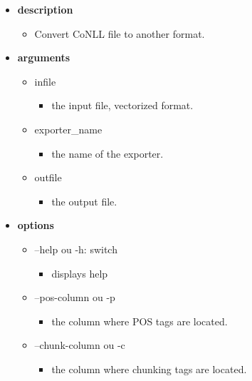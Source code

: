 \documentclass[manual-fr.tex]{subfiles}
\begin{document}
\begin{itemize}
    \item[] \textbf{description}
        \begin{itemize}
            \item[] Convert CoNLL file to another format.
        \end{itemize}
    \item[] \textbf{arguments}
        \begin{itemize}
            \item[] infile
                \begin{itemize}
                    \item[] the input file, vectorized format.
                \end{itemize}
            \item[] exporter\_name
                \begin{itemize}
                    \item[] the name of the exporter.
                \end{itemize}
            \item[] outfile
                \begin{itemize}
                    \item[] the output file.
                \end{itemize}
        \end{itemize}
    \item[] \textbf{options}
        \begin{itemize}
            \item[] --help ou -h: switch
                \begin{itemize}
                    \item[] displays help
                \end{itemize}
            \item[] --pos-column ou -p
                \begin{itemize}
                    \item[] the column where POS tags are located.
                \end{itemize}
            \item[] --chunk-column ou -c
                \begin{itemize}
                    \item[] the column where chunking tags are located.

\end{itemize}
\end{itemize}
\end{itemize}
\end{document}
